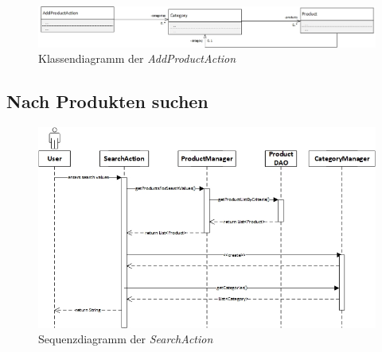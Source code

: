 \documentclass[12pt,a4paper]{article}
\begin{document}
	\begin{figure}[H]
		\centering
		\includegraphics[scale=0.5]{diagrams/AddProductAction_class.jpg}
		\caption{Klassendiagramm der \textit{AddProductAction}}
	\end{figure}
	
	\subsection{Nach Produkten suchen}
	\begin{figure}[H]
		\centering
		\includegraphics[scale=0.7]{diagrams/SearchAction_sequenz.jpg}
		\caption{Sequenzdiagramm der \textit{SearchAction}}
	\end{figure}
	
\end{document}
